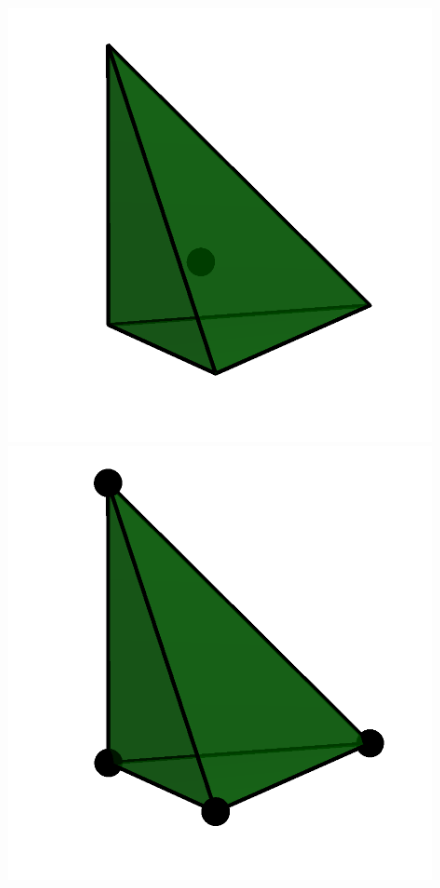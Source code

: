 \begin{figure}
\begin{center}
    \includegraphics[width=\elmfigsizequadruple]{chapters/kirby-6/png/DG0_3d.png}
    \includegraphics[width=\elmfigsizequadruple]{chapters/kirby-6/png/DG1_3d.png}

\end{center}
\end{figure}
